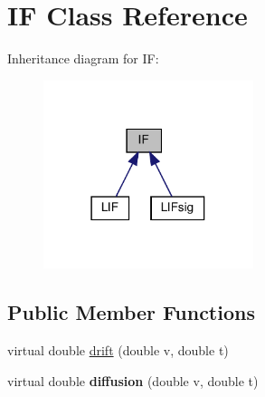 \hypertarget{classIF}{}\section{IF Class Reference}
\label{classIF}


Inheritance diagram for IF\+:\nopagebreak
\begin{figure}[H]
\begin{center}
\leavevmode
\includegraphics[width=174pt]{classIF__inherit__graph}
\end{center}
\end{figure}
\subsection*{Public Member Functions}
\begin{DoxyCompactItemize}
\item 
virtual double \hyperlink{classIF_a9bbd53df68cb9028bf87cf5273253e91}{drift} (double v, double t)
\item 
\mbox{\label{classIF_a45c14ff90b19a93769c2c30741cd482d}} 
virtual double {\bfseries diffusion} (double v, double t)
\end{DoxyCompactItemize}
